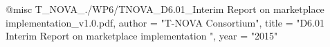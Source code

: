 @misc{ T_NOVA_./WP6/TNOVA_D6.01_Interim Report on marketplace implementation_v1.0.pdf,
       author = "{T-NOVA Consortium}",
       title = "D6.01 Interim Report on marketplace implementation ",
       year = "2015" }

